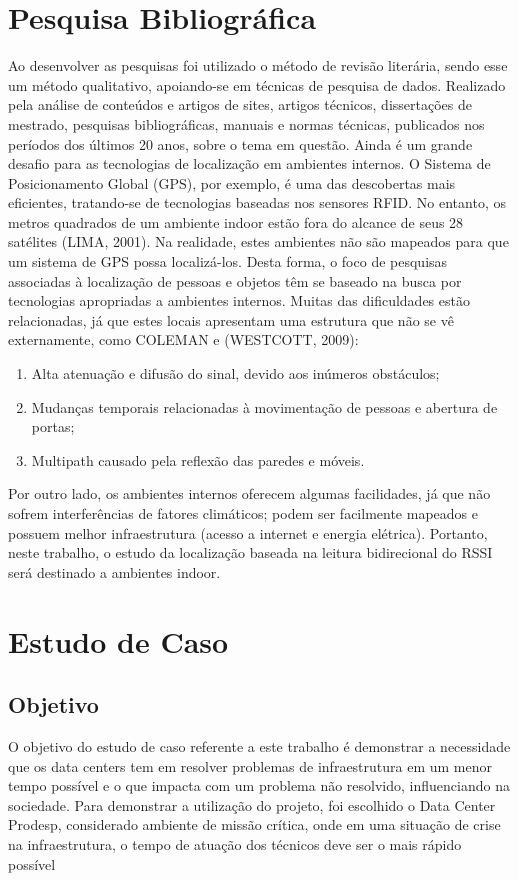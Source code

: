 \documentclass[
	article,			%
	12pt,				%
	oneside,			%
	a4paper,			%
	english,			%
	brazil,				%
	sumario=tradicional
	]{abntex2}
\begin{document}
\section{Pesquisa Bibliográfica}
Ao desenvolver as pesquisas foi utilizado o método de revisão literária, sendo esse um método qualitativo, apoiando-se em técnicas de pesquisa de dados. Realizado pela análise de conteúdos e artigos de sites, artigos técnicos, dissertações de mestrado, pesquisas bibliográficas, manuais e normas técnicas, publicados nos períodos dos últimos 20 anos, sobre o tema em questão.
Ainda é um grande desafio para as tecnologias de localização em ambientes internos. O Sistema de Posicionamento Global (GPS), por exemplo, é uma das descobertas mais eficientes, tratando-se de tecnologias baseadas nos sensores RFID. No entanto, os metros quadrados de um ambiente indoor estão fora do alcance de seus 28 satélites (LIMA, 2001). 
Na realidade, estes ambientes não são mapeados para que um sistema de GPS possa localizá-los. Desta forma, o foco de pesquisas associadas à localização de pessoas e objetos têm se baseado na busca por tecnologias apropriadas a ambientes internos. Muitas das dificuldades estão relacionadas, já que estes locais apresentam uma estrutura que não se vê externamente, como COLEMAN e (WESTCOTT, 2009):
\begin{enumerate}
	\item Alta atenuação e difusão do sinal, devido aos inúmeros obstáculos;
	\item Mudanças temporais relacionadas à movimentação de pessoas e abertura de portas;
	\item Multipath causado pela reflexão das paredes e móveis.	
\end{enumerate}	
Por outro lado, os ambientes internos oferecem algumas facilidades, já que não sofrem interferências de fatores climáticos; podem ser facilmente mapeados e possuem melhor infraestrutura (acesso a internet e energia elétrica). Portanto, neste trabalho, o estudo da localização baseada na leitura bidirecional do RSSI será destinado a ambientes indoor.

\section{Estudo de Caso}
\subsection{Objetivo}
O objetivo do estudo de caso referente a este trabalho é demonstrar a necessidade que os data centers tem em resolver problemas de infraestrutura em um menor tempo possível e o que impacta com um problema não resolvido, influenciando na sociedade.
Para demonstrar a utilização do projeto, foi escolhido o Data Center Prodesp, considerado ambiente de missão crítica, onde em uma situação de crise na infraestrutura, o tempo de atuação dos técnicos deve ser o mais rápido possível
\end{document}
